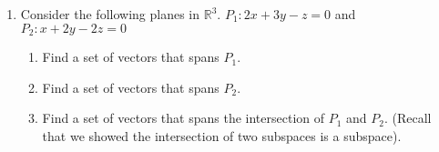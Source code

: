 \documentclass[12pt]{article}
\begin{document}
\begin{enumerate}
        \item Consider the following planes in $\mathbb{R}^3$. $P_1: 2x + 3y - z = 0$ and $P_2: x + 2y - 2z = 0$
              \begin{enumerate}
                      \item Find a set of vectors that spans $P_1$.
                      \item Find a set of vectors that spans $P_2$.
                      \item Find a set of vectors that spans the intersection of $P_1$ and $P_2$. (Recall that we showed the intersection of two subspaces is a subspace).
              \end{enumerate}



\end{enumerate}
\end{document}
